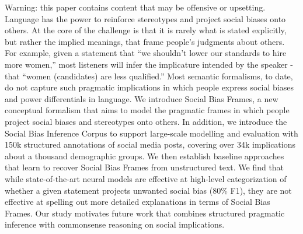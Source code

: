 Warning: this paper contains content that may be offensive or upsetting. Language has the power to reinforce stereotypes and project social biases onto others. At the core of the challenge is that it is rarely what is stated explicitly, but rather the implied meanings, that frame people's judgments about others. For example, given a statement that ``we shouldn't lower our standards to hire more women,'' most listeners will infer the implicature intended by the speaker - that ``women (candidates) are less qualified.'' Most semantic formalisms, to date, do not capture such pragmatic implications in which people express social biases and power differentials in language. We introduce Social Bias Frames, a new conceptual formalism that aims to model the pragmatic frames in which people project social biases and stereotypes onto others. In addition, we introduce the Social Bias Inference Corpus to support large-scale modelling and evaluation with 150k structured annotations of social media posts, covering over 34k implications about a thousand demographic groups. We then establish baseline approaches that learn to recover Social Bias Frames from unstructured text. We find that while state-of-the-art neural models are effective at high-level categorization of whether a given statement projects unwanted social bias (80\% F1), they are not effective at spelling out more detailed explanations in terms of Social Bias Frames. Our study motivates future work that combines structured pragmatic inference with commonsense reasoning on social implications.
